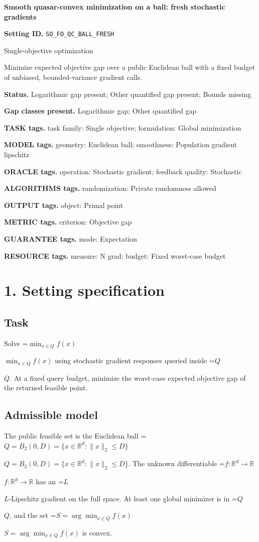 \documentclass[10pt,a4paper]{article}
\newcommand{\AtlasMath}[1]{\par\begingroup\centering\setbox0=\hbox{$\displaystyle #1$}\ifdim\wd0>1.4\linewidth\typeout{ATLAS WIDE FORMULA: \the\wd0}\fi\ifdim\wd0>\linewidth\resizebox{\linewidth}{!}{\box0}\else\box0\fi\par\endgroup}
\newcommand{\AtlasInlineMath}[1]{\begingroup\setbox0=\hbox{$#1$}\ifdim\wd0>.4\linewidth\endgroup\AtlasMath{#1}\else\endgroup$#1$\fi}
\begin{document}
\raggedright

{\LARGE\bfseries\sffamily\color{AtlasNavy} Smooth quasar-convex minimization on a ball: fresh stochastic gradients\par}\vspace{5pt}
\textbf{Setting ID.} \texttt{SO\_\allowbreak{}FO\_\allowbreak{}QC\_\allowbreak{}BALL\_\allowbreak{}FRESH}

Single-objective optimization

Minimize expected objective gap over a public Euclidean ball with a fixed budget of unbiased, bounded-variance gradient calls.

\textbf{Status.} Logarithmic gap present; Other quantified gap present; Bounds missing

\textbf{Gap classes present.} Logarithmic gap; Other quantified gap

\textbf{TASK tags.} task family: Single objective; formulation: Global minimization

\textbf{MODEL tags.} geometry: Euclidean ball; smoothness: Population gradient lipschitz

\textbf{ORACLE tags.} operation: Stochastic gradient; feedback quality: Stochastic

\textbf{ALGORITHMS tags.} randomization: Private randomness allowed

\textbf{OUTPUT tags.} object: Primal point

\textbf{METRIC tags.} criterion: Objective gap

\textbf{GUARANTEE tags.} mode: Expectation

\textbf{RESOURCE tags.} measure: N grad; budget: Fixed worst-case budget

\section{1. Setting specification}
\subsection{Task}
Solve \AtlasInlineMath{\min_{x\in Q} f(x)} using stochastic gradient responses queried inside \AtlasInlineMath{Q}. At a fixed query budget, minimize the worst-case expected objective gap of the returned feasible point.

\subsection{Admissible model}
The public feasible set is the Euclidean ball \AtlasInlineMath{Q=B_2(0,D)=\{x\in\mathbb R^d:\|x\|_2\le D\}}. The unknown differentiable \AtlasInlineMath{f:\mathbb R^d\to\mathbb R} has an \AtlasInlineMath{L}-Lipschitz gradient on the full space. At least one global minimizer is in \AtlasInlineMath{Q}, and the set \AtlasInlineMath{S=\arg\min_{x\in Q} f(x)} is convex.
\end{document}

